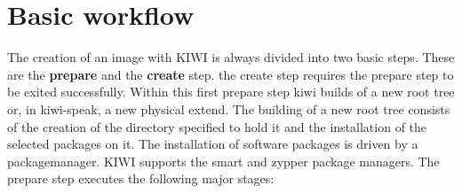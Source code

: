 \chapter{Basic workflow}
\label{chapter:workflow}
\minitoc

The creation of an image with KIWI is always divided into two
basic steps. These are the \textbf{prepare} and the \textbf{create}
step. the create step requires the prepare step to be exited
successfully. Within this first prepare step kiwi builds of a new root
tree or, in kiwi-speak, a new physical extend. The building of a new
root tree consists of the creation of the directory specified to
hold it and the installation of the selected packages on it. The
installation of software packages is driven by a packagemanager.
KIWI supports the smart and zypper package managers. The prepare
step executes the following major stages:

